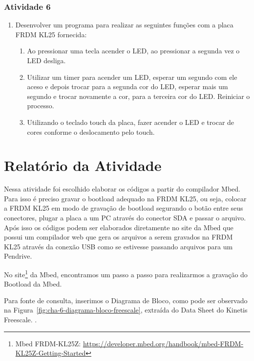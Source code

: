 \documentclass[
	12pt,				%
	openright,			%
  oneside,     %
	a4paper,			%
	english,			%
	french,				%
	spanish,			%
	brazil				%
	]{abntex2}
\begin{document}
\subsubsection*{Atividade 6}

\begin{enumerate}
  \item Desenvolver um programa para realizar as seguintes funções com a placa FRDM KL25 fornecida:
  \begin{enumerate}
    \item Ao pressionar uma tecla acender o LED, ao pressionar a segunda vez o LED desliga.
    \item Utilizar um timer para acender um LED, esperar um segundo com ele aceso e depois trocar para a segunda cor do LED, esperar mais um segundo e trocar novamente a cor, para a terceira cor do LED. Reiniciar o processo.
    \item Utilizando o teclado touch da placa, fazer acender o LED e trocar de cores conforme o deslocamento pelo touch.
  \end{enumerate}
\end{enumerate}


\section{Relatório da Atividade} %
\label{sec:kinetis_freescale-consideracoes}

Nessa atividade foi escolhido elaborar os códigos a partir do compilador Mbed. Para isso é preciso gravar o bootload adequado na FRDM KL25, ou seja, colocar a FRDM KL25 em modo de gravação de bootload segurando o botão entre seus conectores, plugar a placa a um PC através do conector SDA e passar o arquivo. Após isso os códigos podem ser elaborados diretamente no site da Mbed que possui um compilador web que gera os arquivos a serem gravados na FRDM KL25 através da conexão USB como se estivesse passando arquivos para um Pendrive.

No site\footnote{Mbed FRDM-KL25Z: \url{https://developer.mbed.org/handbook/mbed-FRDM-KL25Z-Getting-Started}} da Mbed, encontramos um passo a passo para realizarmos a gravação do Bootload da Mbed.

Para fonte de consulta, inserimos o Diagrama de Bloco, como pode ser observado na Figura~\ref{fig:cha-6-diagrama-bloco-freescale}, extraída do Data Sheet do Kinetis Freescale. \cite{FreescaleSemiconductor2013}.
\end{document}
